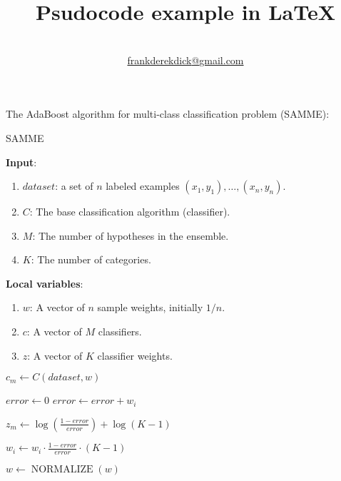 \documentclass[12pt, a4paper]{article}
\makeatletter
\newcommand*\myat{{\fontfamily{ptm}\selectfont @}}
\makeatother
\begin{document}
\title{Psudocode example in \LaTeX}
\author{\\
	\href{mailto:frankderekdick@gmail.com}{frankderekdick\myat gmail.com}
\date{}
}

\maketitle

\pagebreak

The AdaBoost algorithm for multi-class classification problem (SAMME):

\begin{algorithm}[H]
    \caption{SAMME}\label{samme}
    \begin{algorithmic}[1]
        \Statex \textbf{Input}: \begin{enumerate}
            \item $dataset$: a set of $n$ labeled examples $(x_1, y_1), \dots, (x_n, y_n)$.
            \item $C$: The base classification algorithm (classifier).
            \item $M$: The number of hypotheses in the ensemble.
            \item $K$: The number of categories.
        \end{enumerate}
        
        \Statex \textbf{Local variables}: \begin{enumerate}
            \item $w$: A vector of $n$ sample weights, initially $1/n$.
            \item $c$: A vector of $M$ classifiers.
            \item $z$: A vector of $K$ classifier weights.
        \end{enumerate}
        
            \State $c_m \gets C(dataset, w)$ 
            
            \Statex
            \State $error \gets 0$ 
                    \State $error \gets error + w_i$
                \EndIf
            \EndFor
            
            \Statex
            \State $z_m \gets \log \left(\frac{1 - error}{error}\right) + \log (K-1)$ 
            
            \Statex
             
                    \State $w_i \gets w_i \cdot \frac{1 - error}{error} \cdot (K - 1)$
                \EndIf
            \EndFor
            
            \Statex
            \State $w \gets \operatorname{NORMALIZE}(w)$ 
        \EndFor
        
        \EndFunction
    \end{algorithmic}
\end{algorithm}
\end{document}

